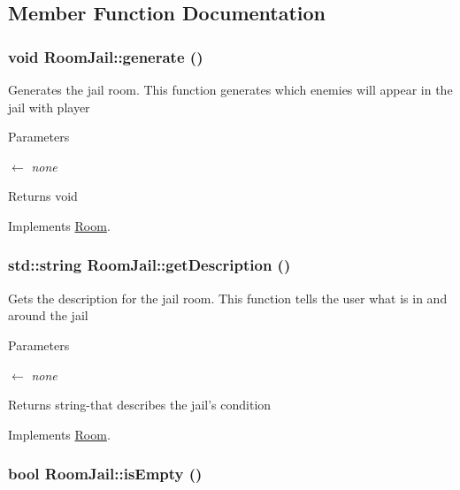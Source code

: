 \subsection{Member Function Documentation}
\hypertarget{classRoomJail_ae0c2bba84e14c607af53a55b3e4d1810}{
\subsubsection[{generate}]{\setlength{\rightskip}{0pt plus 5cm}void RoomJail::generate ()}}
\label{classRoomJail_ae0c2bba84e14c607af53a55b3e4d1810}


Generates the jail room. This function generates which enemies will appear in the jail with player 
\begin{DoxyParams}{Parameters}
\item[\mbox{$\leftarrow$} {\em none}]\end{DoxyParams}
\begin{DoxyReturn}{Returns}
void 
\end{DoxyReturn}


Implements \hyperlink{classRoom_a3556128b8e7f544fa618576fbab4b52e}{Room}.\hypertarget{classRoomJail_a4f33dd7e286e3505b622d97b30616d28}{
\subsubsection[{getDescription}]{\setlength{\rightskip}{0pt plus 5cm}std::string RoomJail::getDescription ()}}
\label{classRoomJail_a4f33dd7e286e3505b622d97b30616d28}


Gets the description for the jail room. This function tells the user what is in and around the jail 
\begin{DoxyParams}{Parameters}
\item[\mbox{$\leftarrow$} {\em none}]\end{DoxyParams}
\begin{DoxyReturn}{Returns}
string-\/that describes the jail's condition 
\end{DoxyReturn}


Implements \hyperlink{classRoom_aacf839325fa7c6b08d21533b0780025c}{Room}.\hypertarget{classRoomJail_a33860dcae7024da01ab1063bc4b1db0d}{
\subsubsection[{isEmpty}]{\setlength{\rightskip}{0pt plus 5cm}bool RoomJail::isEmpty ()}}
\label{classRoomJail_a33860dcae7024da01ab1063bc4b1db0d}


